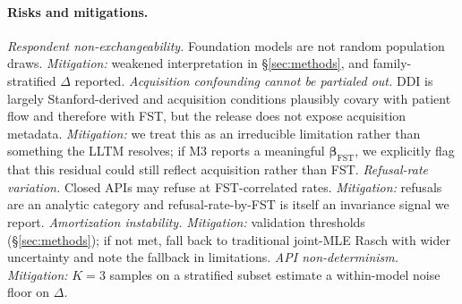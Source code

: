\documentclass{article}
\begin{document}
\paragraph{Risks and mitigations.}
\textit{Respondent non-exchangeability.} Foundation models are not random population draws. \emph{Mitigation:} weakened interpretation in \S\ref{sec:methods}, and family-stratified $\Delta$ reported.
\textit{Acquisition confounding cannot be partialed out.} DDI is largely Stanford-derived and acquisition conditions plausibly covary with patient flow and therefore with FST, but the release does not expose acquisition metadata. \emph{Mitigation:} we treat this as an irreducible limitation rather than something the LLTM resolves; if M3 reports a meaningful $\boldsymbol{\beta}_{\text{FST}}$, we explicitly flag that this residual could still reflect acquisition rather than FST.
\textit{Refusal-rate variation.} Closed APIs may refuse at FST-correlated rates. \emph{Mitigation:} refusals are an analytic category and refusal-rate-by-FST is itself an invariance signal we report.
\textit{Amortization instability.} \emph{Mitigation:} validation thresholds (\S\ref{sec:methods}); if not met, fall back to traditional joint-MLE Rasch with wider uncertainty and note the fallback in limitations.
\textit{API non-determinism.} \emph{Mitigation:} $K = 3$ samples on a stratified subset estimate a within-model noise floor on $\Delta$.

\setlength{\bibsep}{0.0pt plus 0.3ex}
\small


\end{document}
